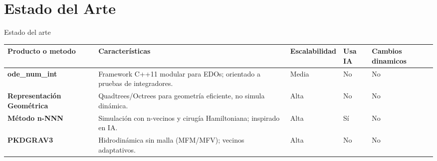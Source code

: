 \section{Estado del Arte}

\begin{frame}{Estado del arte}
    \centering
    \label{tab:arte}
    \vspace{-0.1cm}
    \begin{adjustbox}{max width=0.9\textwidth,max height=0.7\textheight, keepaspectratio}
        \renewcommand{\arraystretch}{1.3}
            \begin{tabular}{@{}>{\bfseries}p{} p{} p{} p{} p{}@{}}
            \toprule
            \textbf{Producto o metodo} & \textbf{Características} & \textbf{Escalabilidad} & \textbf{Usa IA} & \textbf{Cambios dinamicos} \\
            \midrule
            ode\_num\_int & Framework C++11 modular para EDOs; orientado a pruebas de integradores. & Media & No & No \\
            Representación Geométrica & Quadtrees/Octrees para geometría eficiente, no simula dinámica. & Alta & No & No \\
            Método n-NNN & Simulación con n-vecinos y cirugía Hamiltoniana; inspirado en IA. & Alta & Sí & No \\
            PKDGRAV3 & Hidrodinámica sin malla (MFM/MFV); vecinos adaptativos. & Alta & No & No \\
            \bottomrule
            \end{tabular}
    \end{adjustbox}
    \smallskip
\end{frame}



